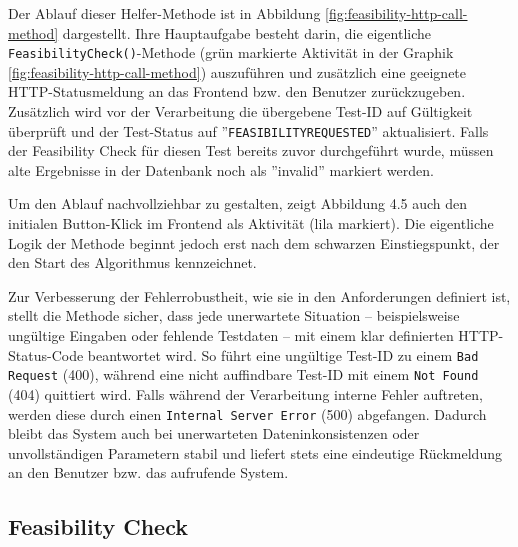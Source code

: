 Der Ablauf dieser Helfer-Methode ist in Abbildung \ref{fig:feasibility-http-call-method} dargestellt. Ihre Hauptaufgabe besteht darin, die eigentliche \texttt{FeasibilityCheck()}-Methode (grün markierte Aktivität in der Graphik \ref{fig:feasibility-http-call-method}) auszuführen und zusätzlich eine geeignete HTTP-Statusmeldung an das Frontend bzw. den Benutzer zurückzugeben. Zusätzlich wird vor der Verarbeitung die übergebene Test-ID auf Gültigkeit überprüft und der Test-Status auf ''\texttt{FEASIBILITYREQUESTED}'' aktualisiert. Falls der Feasibility Check für diesen Test bereits zuvor durchgeführt wurde, müssen alte Ergebnisse in der Datenbank noch als ''invalid'' markiert werden.

Um den Ablauf nachvollziehbar zu gestalten, zeigt Abbildung 4.5 auch den initialen Button-Klick im Frontend als Aktivität (lila markiert). Die eigentliche Logik der Methode beginnt jedoch erst nach dem schwarzen Einstiegspunkt, der den Start des Algorithmus kennzeichnet.

Zur Verbesserung der Fehlerrobustheit, wie sie in den Anforderungen definiert ist, stellt die Methode sicher, dass jede unerwartete Situation – beispielsweise ungültige Eingaben oder fehlende Testdaten – mit einem klar definierten HTTP-Status-Code beantwortet wird. So führt eine ungültige Test-ID zu einem \texttt{Bad Request} (400), während eine nicht auffindbare Test-ID mit einem \texttt{Not Found} (404) quittiert wird. Falls während der Verarbeitung interne Fehler auftreten, werden diese durch einen \texttt{Internal Server Error} (500) abgefangen. Dadurch bleibt das System auch bei unerwarteten Dateninkonsistenzen oder unvollständigen Parametern stabil und liefert stets eine eindeutige Rückmeldung an den Benutzer bzw. das aufrufende System.

\subsection{Feasibility Check}

